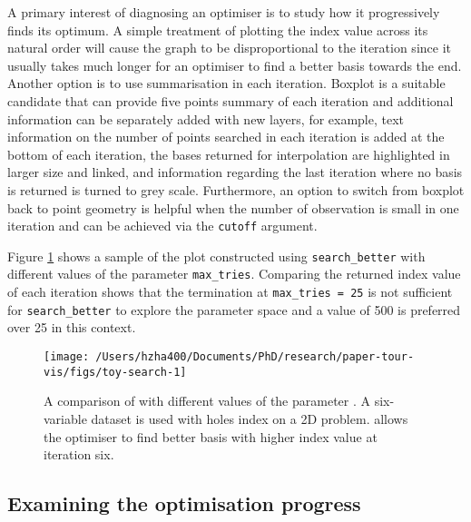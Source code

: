 A primary interest of diagnosing an optimiser is to study how it
progressively finds its optimum. A simple treatment of plotting the
index value across its natural order will cause the graph to be
disproportional to the iteration since it usually takes much longer for
an optimiser to find a better basis towards the end. Another option is
to use summarisation in each iteration. Boxplot is a suitable candidate
that can provide five points summary of each iteration and additional
information can be separately added with new layers, for example, text
information on the number of points searched in each iteration is added
at the bottom of each iteration, the bases returned for interpolation
are highlighted in larger size and linked, and information regarding the
last iteration where no basis is returned is turned to grey scale.
Furthermore, an option to switch from boxplot back to point geometry is
helpful when the number of observation is small in one iteration and can
be achieved via the \texttt{cutoff} argument.

Figure \ref{fig:toy-search} shows a sample of the plot constructed using
\texttt{search\_better} with different values of the parameter
\texttt{max\_tries}. Comparing the returned index value of each
iteration shows that the termination at \texttt{max\_tries\ =\ 25} is
not sufficient for \texttt{search\_better} to explore the parameter
space and a value of 500 is preferred over 25 in this context.

\begin{Schunk}
\begin{figure}

{\centering \texttt{[image: /Users/hzha400/Documents/PhD/research/paper-tour-vis/figs/toy-search-1]} 

}

\caption{A comparison of  with different values of the parameter . A six-variable dataset  is used with holes index on a 2D problem.  allows the optimiser to find better basis with higher index value at iteration six.}\label{fig:toy-search}
\end{figure}
\end{Schunk}

\hypertarget{toy-interp}{%
\subsection{Examining the optimisation progress}\label{toy-interp}}

